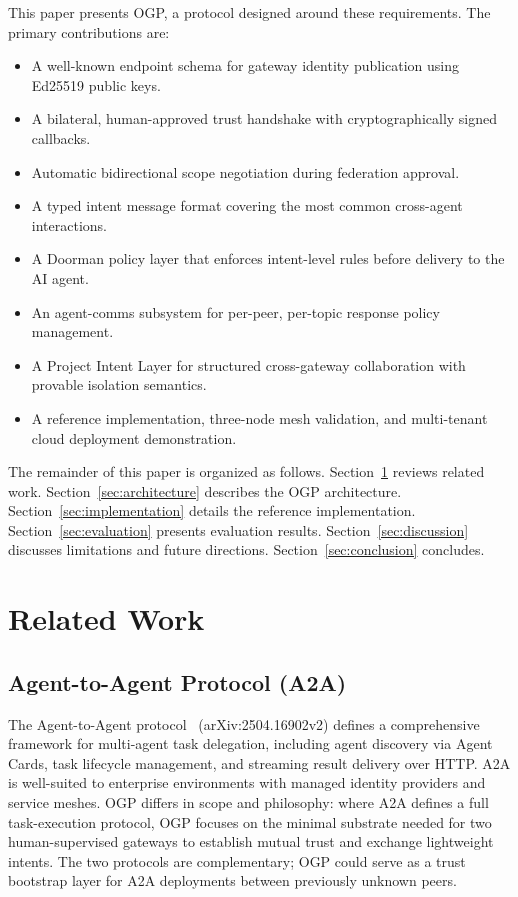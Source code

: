 \documentclass[conference]{IEEEtran}
\begin{document}
This paper presents OGP, a protocol designed around these requirements. The primary contributions are:

\begin{itemize}
  \item A well-known endpoint schema for gateway identity publication using Ed25519 public keys.
  \item A bilateral, human-approved trust handshake with cryptographically signed callbacks.
  \item Automatic bidirectional scope negotiation during federation approval.
  \item A typed intent message format covering the most common cross-agent interactions.
  \item A Doorman policy layer that enforces intent-level rules before delivery to the AI agent.
  \item An agent-comms subsystem for per-peer, per-topic response policy management.
  \item A Project Intent Layer for structured cross-gateway collaboration with provable isolation semantics.
  \item A reference implementation, three-node mesh validation, and multi-tenant cloud deployment demonstration.
\end{itemize}

The remainder of this paper is organized as follows. Section~\ref{sec:related} reviews related work. Section~\ref{sec:architecture} describes the OGP architecture. Section~\ref{sec:implementation} details the reference implementation. Section~\ref{sec:evaluation} presents evaluation results. Section~\ref{sec:discussion} discusses limitations and future directions. Section~\ref{sec:conclusion} concludes.

\section{Related Work}
\label{sec:related}

\subsection{Agent-to-Agent Protocol (A2A)}

The Agent-to-Agent protocol~\cite{a2a2025} (arXiv:2504.16902v2) defines a comprehensive framework for multi-agent task delegation, including agent discovery via Agent Cards, task lifecycle management, and streaming result delivery over HTTP. A2A is well-suited to enterprise environments with managed identity providers and service meshes. OGP differs in scope and philosophy: where A2A defines a full task-execution protocol, OGP focuses on the minimal substrate needed for two human-supervised gateways to establish mutual trust and exchange lightweight intents. The two protocols are complementary; OGP could serve as a trust bootstrap layer for A2A deployments between previously unknown peers.
\end{document}

